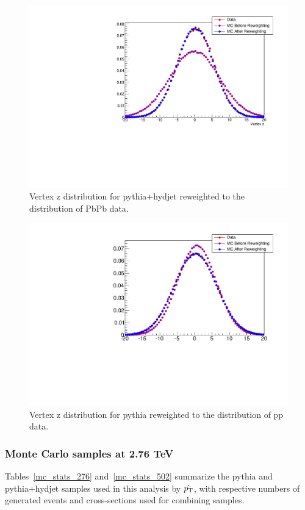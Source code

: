 \begin{figure}[ht]
\begin {center}
  \includegraphics[width=0.58\linewidth]{figures/Samples/HydjetVzReweighting.pdf}
  \caption{
    Vertex z distribution for {\sc pythia+hydjet} reweighted to the distribution of PbPb data.
  }
\label{fig:HydVz_Reweighting}
\end{center}
\end{figure}




\begin{figure}[ht]
\begin {center}
  \includegraphics[width=0.58\linewidth]{figures/Samples/PythiaVzReweighting.pdf}
  \caption{
    Vertex z distribution for {\sc pythia} reweighted to the distribution of pp data.
  }
\label{fig:PythiaVz_Reweighting}
\end{center}
\end{figure}


\subsubsection{Monte Carlo samples at 2.76 TeV}

Tables~\ref{mc_stats_276}  and~\ref{mc_stats_502} summarize the {\sc pythia} and {\sc pythia+hydjet} samples used in this analysis by $\hat{p_{\rm T}}$, with respective numbers of generated events and cross-sections used for combining samples. 

